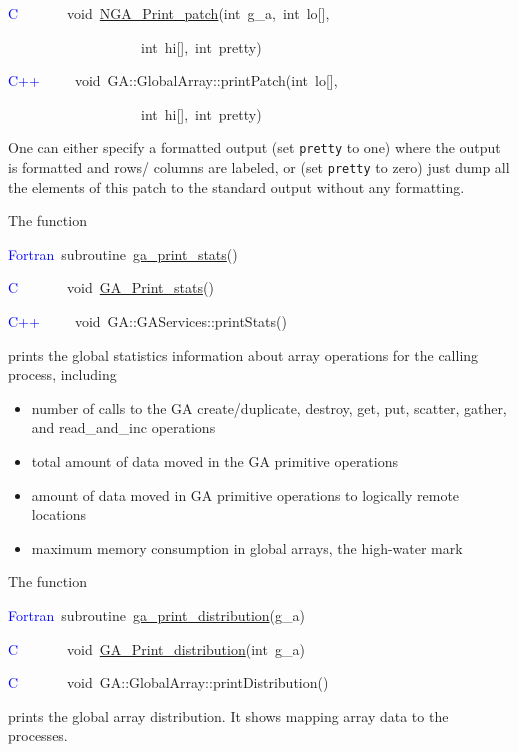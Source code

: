 \textcolor{blue}{C}~~~~~~~void~\href{https://hpc.pnl.gov/globalarrays/api/c_op_api.html\#ga_print_patch}{NGA\_{}Print\_{}patch}(int~g\_a,~int~lo{[}{]},~

~~~~~~~~~~~~~~~~~~~int~hi{[}{]},~int~pretty)~

\textcolor{blue}{C++}~~~~~void~GA::GlobalArray::printPatch(int~lo{[}{]},~

~~~~~~~~~~~~~~~~~~~int~hi{[}{]},~int~pretty)

One can either specify a formatted output (set \texttt{pretty} to
one) where the output is formatted and rows/ columns are labeled,
or (set \texttt{pretty} to zero) just dump all the elements of this
patch to the standard output without any formatting.

The function

\textcolor{blue}{Fortran}~subroutine~\href{https://hpc.pnl.gov/globalarrays/api/f_op_api.html\#ga_print_stats}{ga\_{}print\_{}stats}()~

\textcolor{blue}{C}~~~~~~~void~\href{https://hpc.pnl.gov/globalarrays/api/c_op_api.html\#ga_print_stats}{GA\_{}Print\_{}stats}()~

\textcolor{blue}{C++}~~~~~void~GA::GAServices::printStats()

prints the global statistics information about array operations for
the calling process, including
\begin{itemize}
\item number of calls to the GA create/duplicate, destroy, get, put, scatter,
gather, and read\_and\_inc operations 
\item total amount of data moved in the GA primitive operations 
\item amount of data moved in GA primitive operations to logically remote
locations 
\item maximum memory consumption in global arrays, the \textquotedbl{}high-water
mark\textquotedbl{}
\end{itemize}
The function

\textcolor{blue}{Fortran}~subroutine~\href{https://hpc.pnl.gov/globalarrays/api/f_op_api.html\#ga_print_distribution}{ga\_{}print\_{}distribution}(g\_a)~

\textcolor{blue}{C~}~~~~~~void~\href{https://hpc.pnl.gov/globalarrays/api/c_op_api.html\#ga_print_distribution}{GA\_{}Print\_{}distribution}(int~g\_a)

\textcolor{blue}{C}~~~~~~~void~GA::GlobalArray::printDistribution()

prints the global array distribution. It shows mapping array data
to the processes.

